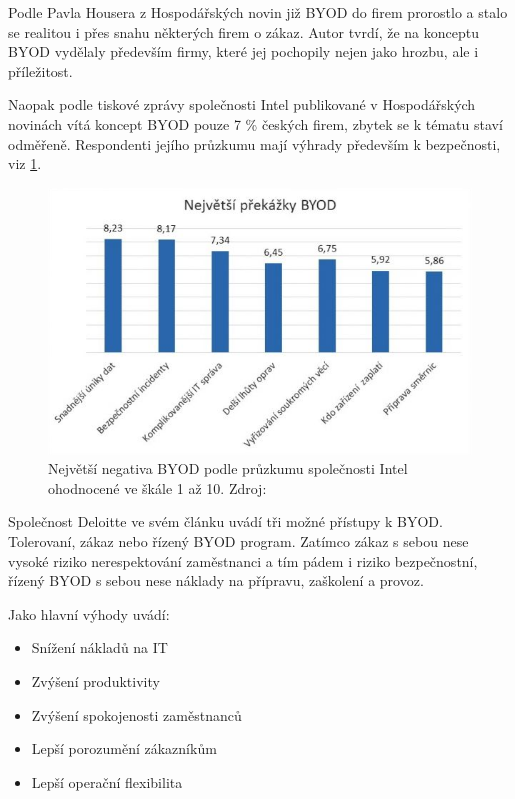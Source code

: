 Podle Pavla Housera z Hospodářských novin  již BYOD do firem prorostlo a stalo se realitou i přes snahu některých firem o zákaz. Autor tvrdí, že na konceptu BYOD vydělaly především firmy, které jej pochopily nejen jako hrozbu, ale i příležitost. 

Naopak podle tiskové zprávy společnosti Intel publikované v Hospodářských novinách  vítá koncept BYOD pouze 7 \% českých firem, zbytek se k tématu staví odměřeně. Respondenti jejího průzkumu mají výhrady především k bezpečnosti, viz \ref{intelBYOD}.

\begin{figure}[h!]\label{intelBYOD}
\centering
\includegraphics[width=12cm]{img/intelBYOD}
\caption{Největší negativa BYOD podle průzkumu společnosti Intel ohodnocené ve škále 1 až 10. Zdroj: } 
\end{figure}

Společnost Deloitte ve svém článku uvádí tři možné přístupy k BYOD. Tolerovaní, zákaz nebo řízený BYOD program. Zatímco zákaz s sebou nese vysoké riziko nerespektování zaměstnanci a tím pádem i riziko bezpečnostní, řízený BYOD s sebou nese náklady na přípravu, zaškolení a provoz.

Jako hlavní výhody uvádí:
\begin{itemize}
\item Snížení nákladů na IT
\item Zvýšení produktivity
\item Zvýšení spokojenosti zaměstnanců
\item Lepší porozumění zákazníkům
\item Lepší operační flexibilita
\end{itemize}

